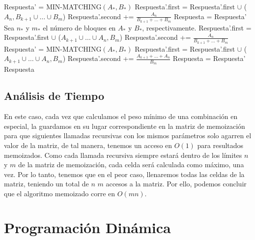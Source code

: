 \documentclass[12pt,a4,paper]{article}
\begin{document}
\begin{algorithmic}[1]
                \STATE Respuesta' = {\textsc{MIN-MATCHING}$(A_*, B_*)$}
                \STATE Respuesta'.first = Respuesta'.first $\cup$ ($A_n, B_{k+1}\cup \ldots\cup B_m$)
                \STATE Respuesta'.second += $\frac{A_n}{B_{k+1}+\ldots+B_m}$
            \ENDIF
                \STATE Respuesta = Respuesta'
            \ENDIF
        \ENDFOR
        \STATE
         
             
            \STATE Sea $n_*$ y $m_*$ el número de bloques en $A_*$ y $B_*$, respectivamente.
                \STATE Respuesta'.first = Respuesta'.first $\cup$ ($A_{k+1} \cup  \ldots \cup  A_n, B_m$)
                \STATE Respuesta'.second += $\frac{A_n}{B_{k+1}+\ldots+B_m}$
            \ELSE
                \STATE Respuesta' = {\textsc{MIN-MATCHING}$(A_*, B_*)$}
                \STATE Respuesta'.first = Respuesta'.first $\cup$ ($A_{k+1} \cup  \ldots \cup  A_n, B_m$)
                \STATE Respuesta'.second += $\frac{A_{k+1} + \ldots + A_n}{B_m}$
            \ENDIF
                \STATE Respuesta = Respuesta'
            \ENDIF
        \ENDFOR
        \STATE
        \RETURN Respuesta
\end{algorithmic}

\subsection*{Análisis de Tiempo}

En este caso, cada vez que calculamos el peso mínimo de una combinación en especial, la guardamos en su lugar correspondiente en la matriz de memoización para que siguientes llamadas recursivas con los mismos parámetros solo agarren el valor de la matriz, de tal manera, tenemos un acceso en $O(1)$ para resultados memoizados. Como cada llamada recursiva siempre estará dentro de los límites $n$ y $m$ de la matriz de memoización, cada celda será calculada como máximo, una vez. Por lo tanto, tenemos que en el peor caso, llenaremos todas las celdas de la matriz, teniendo un total de $n$  $m$ accesos a la matriz. Por ello, podemos concluir que el algoritmo memoizado corre en $O(mn)$.

\section{Programación Dinámica}
\end{document}
